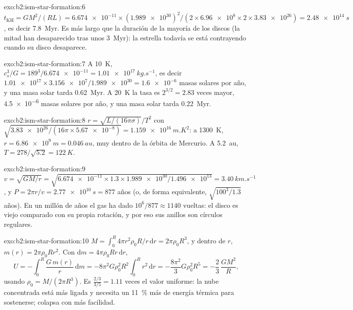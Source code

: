 \begin{solution}{exo:b2:ism-star-formation:6}
$t_{\mathrm{KH}} = GM^2/(RL) = \num{6.674e-11}\times(\num{1.989e30})^2/(2\times
\num{6.96e8}\times2\times\num{3.83e26}) = \qty{2.48e14}{s}$, es decir
\qty{7.8}{Myr}. Es más largo que la duración de la mayoría de los discos (la mitad han desaparecido tras
unos \qty{3}{Myr}): la estrella todavía se está contrayendo cuando su disco desaparece.
\end{solution}

\begin{solution}{exo:b2:ism-star-formation:7}
A \qty{10}{K}, $c_s^3/G = 189^3/\num{6.674e-11} = \qty{1.01e17}{kg.s^{-1}}$, es decir
$\num{1.01e17}\times\num{3.156e7}/\num{1.989e30} = \num{1.6e-6}$ masas solares por
año, y una masa solar tarda \qty{0.62}{Myr}. A \qty{20}{K} la tasa es
$2^{3/2} = 2.83$ veces mayor, \num{4.5e-6} masas solares por año, y una masa
solar tarda \qty{0.22}{Myr}.
\end{solution}

\begin{solution}{exo:b2:ism-star-formation:8}
$r = \sqrt{L/(16\pi\sigma)}/T^2$ con $\sqrt{\num{3.83e26}/(16\pi\times\num{5.67e-8})}
= \qty{1.159e16}{m.K^2}$: a \qty{1300}{K}, $r = \qty{6.86e9}{m} = \qty{0.046}{au}$,
muy dentro de la órbita de Mercurio. A \qty{5.2}{au}, $T = 278/\sqrt{5.2} = \qty{122}{K}$.
\end{solution}

\begin{solution}{exo:b2:ism-star-formation:9}
$v = \sqrt{GM/r} = \sqrt{\num{6.674e-11}\times1.3\times\num{1.989e30}/\num{1.496e13}}
= \qty{3.40}{km.s^{-1}}$, y $P = 2\pi r/v = \qty{2.77e10}{s} = 877$ años
(o, de forma equivalente, $\sqrt{100^3/1.3}$ años). En un millón de años el gas ha dado
$10^6/877 \approx \num{1140}$ vueltas: el disco es viejo comparado con su propia rotación,
y por eso sus anillos son círculos regulares.
\end{solution}

\begin{solution}{exo:b2:ism-star-formation:10}
$M = \int_0^R 4\pi r^2\rho_0R/r\,\mathrm dr = 2\pi\rho_0R^3$, y dentro de $r$,
$m(r) = 2\pi\rho_0Rr^2$. Con $\mathrm dm = 4\pi\rho_0Rr\,\mathrm dr$,
\[
  U = -\int_0^R \frac{G\,m(r)}{r}\,\mathrm dm
    = -8\pi^2G\rho_0^2R^2\int_0^R r^2\,\mathrm dr = -\frac{8\pi^2}{3}G\rho_0^2R^5
    = -\frac23\,\frac{GM^2}{R},
\]
usando $\rho_0 = M/(2\pi R^3)$. Es $\tfrac{2/3}{3/5} = 1.11$ veces el valor uniforme:
la nube concentrada está más ligada y necesita un \qty{11}{\percent} más de
energía térmica para sostenerse; colapsa con más facilidad.
\end{solution}

